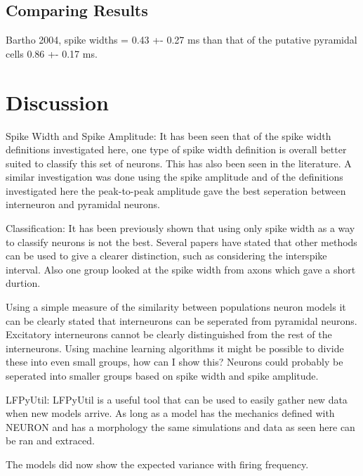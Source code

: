 \documentclass[altfont, fleqn]{uiophd}
\begin{document}
\section{Comparing Results}
Bartho 2004, spike widths  = 0.43 +- 0.27 ms than that of the
putative pyramidal cells 0.86 +- 0.17 ms.

\chapter{Discussion}

Spike Width and Spike Amplitude:
It has been seen that of the spike width definitions investigated here, 
one type of spike width definition is overall
better suited to classify this set of neurons. 
This has also been seen in the literature. 
A similar investigation was done using the spike amplitude and of the
definitions investigated here the peak-to-peak amplitude gave the best
seperation between interneuron and pyramidal neurons. 

Classification:
It has been previously shown that using only spike width as 
a way to classify neurons is not the best. 
Several papers have stated that other methods can be used to give 
a clearer distinction, such as considering the interspike interval. 
Also one group looked at the spike width from axons which gave a short 
durtion. 

Using a simple measure of the similarity between populations
neuron models it can be clearly stated that interneurons can be seperated
from pyramidal neurons. 
Excitatory interneurons cannot be clearly distinguished from the rest of the
interneurons. 
Using machine learning algorithms it might be possible to divide these
into even small groups, how can I show this?
Neurons could probably be seperated into smaller groups based on
spike width and spike amplitude. 

LFPyUtil: 
LFPyUtil is a useful tool that can be used to easily gather
new data when new models arrive. 
As long as a model has the mechanics defined with NEURON and has
a morphology the same simulations and data as seen here can be ran 
and extraced.

The models did now show the expected variance with firing frequency. 
\end{document}
